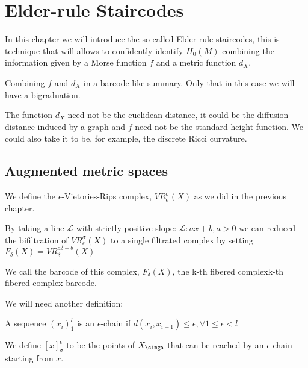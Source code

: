 \chapter{Elder-rule Staircodes}
\label{erchapter}

In this chapter we will introduce the so-called Elder-rule staircodes, this
is technique that will allows to confidently identify $H_0(M)$ combining the information given by 
a Morse function $f$ and a metric function $d_X$.

Combining $f$ and $d_X$ in a barcode-like summary. Only that in this case we will
have a bigraduation.

The function $d_X$ need not be the euclidean distance, it could be the diffusion distance
induced by a graph and $f$ need not be the standard height function. We could also take it to be,
for example, the discrete Ricci curvature.

\section{Augmented metric spaces}



We define the $\epsilon$-Vietories-Rips complex, $VR^\sigma_\epsilon(X)$ as we did in the previous chapter. 

By taking a line $\mathcal{L}$ with strictly positive slope:
$\mathcal{L}:{ax+b,a>0}$ we can reduced the bifiltration of $VR^\sigma_\epsilon(X)$ to a single filtrated complex
by setting $F_\delta(X)=VR_\delta^{a\delta+b}(X)$

We call the barcode of this complex, $F_\delta(X)$, the k-th fibered complexk-th fibered complex barcode.

We will need another definition:

\begin{definition}
    A sequence $(x_i)_1^l$ is an $\epsilon$-chain if
    $d(x_i,x_{i+1})\leq \epsilon,\forall 1\leq\epsilon < l$


    We define $[x]_\sigma^\epsilon$ to be 
    the points of $X_\simga$ that can be reached by an $\epsilon$-chain
    starting from $x$.
\end{definition}
